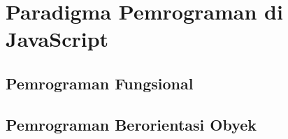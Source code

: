 \chapter{Paradigma Pemrograman di JavaScript}

\section{Pemrograman Fungsional}


\section{Pemrograman Berorientasi Obyek}



